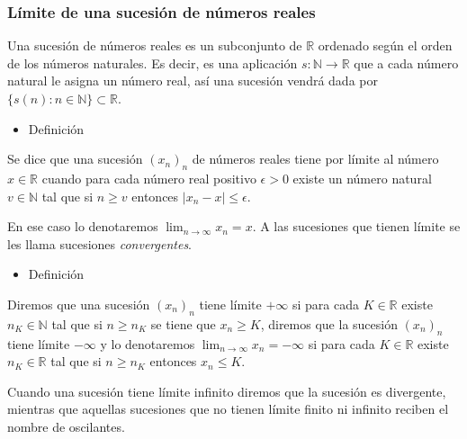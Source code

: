 \documentclass[12pt]{article}
\begin{document}
\subsubsection{Límite de una sucesión de números reales}
Una sucesión de números reales es un subconjunto de $\mathbb{R}$ ordenado según el orden de los números naturales. Es decir, es una aplicación $s:\mathbb{N}\longrightarrow\mathbb{R}$ que a cada número natural le asigna un número real, así una sucesión vendrá dada por $\{s(n):n\in\mathbb{N}\}\subset\mathbb{R}$.
\begin{itemize}[label=\color{red}\textbullet, leftmargin=*]
	\item \color{lightblue}Definición
\end{itemize}
Se dice que una sucesión $(x_n)_n$ de números reales tiene por límite al número $x\in\mathbb{R}$ cuando para cada número real positivo $\epsilon>0$ existe un número natural $v\in\mathbb{N}$ tal que si $n\ge v$ entonces $|x_n-x|\le\epsilon$.

En ese caso lo denotaremos $\lim_{n\to\infty}x_n=x$. A las sucesiones que tienen límite se les llama sucesiones \textit{convergentes}.
\begin{itemize}[label=\color{red}\textbullet, leftmargin=*]
	\item \color{lightblue} Definición
\end{itemize}
Diremos que una sucesión $(x_n)_n$ tiene límite $+\infty$ si para cada $K\in\mathbb{R}$ existe $n_K\in\mathbb{N}$ tal que si $n\ge n_K$ se tiene que $x_n\ge K$, diremos que la sucesión $(x_n)_n$ tiene límite $-\infty$ y lo denotaremos $\lim_{n\to\infty}x_n=-\infty$ si para cada $K\in\mathbb{R}$ existe $n_K\in\mathbb{R}$ tal que si $n\ge n_K$ entonces $x_n\le K$.

Cuando una sucesión tiene límite infinito diremos que la sucesión es divergente, mientras que aquellas sucesiones que no tienen límite finito ni infinito reciben el nombre de oscilantes.
\end{document}
